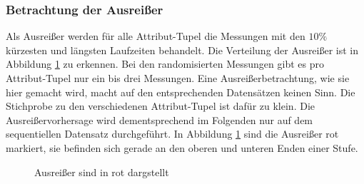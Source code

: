 \documentclass[
	12pt,
	a4paper,
	BCOR10mm,
	DIV14,
	listof=totoc,
	bibliography=totoc,
	headsepline
]{scrreprt}
\begin{document}
\subsubsection{Betrachtung der Ausreißer}
Als Ausreißer werden für alle Attribut-Tupel die Messungen mit den $10\%$ kürzesten und längsten Laufzeiten behandelt. Die Verteilung der Ausreißer ist in Abbildung \ref{fig:ausreisser} zu erkennen.
Bei den randomisierten Messungen gibt es pro Attribut-Tupel nur ein bis drei Messungen. Eine Ausreißerbetrachtung, wie sie hier gemacht wird, macht auf den entsprechenden Datensätzen keinen Sinn. Die Stichprobe zu den verschiedenen Attribut-Tupel ist dafür zu klein.
Die Ausreißervorhersage wird dementsprechend im Folgenden nur auf dem sequentiellen Datensatz durchgeführt.
In Abbildung \ref{fig:ausreisser} sind die Ausreißer rot markiert, sie befinden sich gerade an den oberen und unteren Enden einer Stufe.

\begin{figure}
	\hfill
	\caption{Ausreißer sind in rot dargstellt}
	\label{fig:ausreisser}
\end{figure} 
\end{document}
